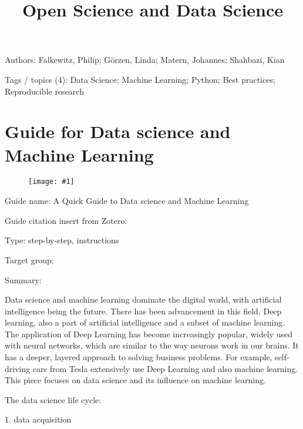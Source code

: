 \documentclass{article}
\newlength{\imgwidth}
\newcommand\scaledgraphics[2]{%
                
\settowidth{\imgwidth}{\texttt{[image: \#1]}}%
                
\setlength{\imgwidth}{\minof{\imgwidth}{#2\textwidth}}%
                
\texttt{[image: \#1]}%
                
}
\begin{document}
\title{Open Science and Data Science}

\maketitle


Authors: Falkewitz, Philip;  Görzen, Linda; Matern, Johannes;  Shahbazi, Kian 


Tags / topics (4): Data Science; Machine Learning; Python; Best practices; Reproducible research





\section{Guide for Data science and Machine Learning}\label{H2305886}






\begin{center}
\begin{figure}
\scaledgraphics{a6637b1c-427c-4ae5-a756-e31455d2fc96.png}{0.5}
\label{F25480991}
\end{figure}


\end{center}


 


Guide name: A Quick Guide to Data science and Machine Learning


Guide citation insert from Zotero: \autocite{qureshi_quick_2020}


Type: step-by-step, instructions


Target group:


Summary: 


Data science and machine learning dominate the digital world, with artificial intelligence being the future. There has been advancement in this field. Deep learning, also a part of artificial intelligence and a subset of machine learning. The application of Deep Learning has become increasingly popular, widely used with neural networks, which are similar to the way neurons work in our brains. It has a deeper, layered approach to solving business problems. For example, self-driving cars from Tesla extensively use Deep Learning and also machine learning. This piece focuses on data science and its influence on machine learning.


The data science life cycle:


1. data acquisition
\end{document}
